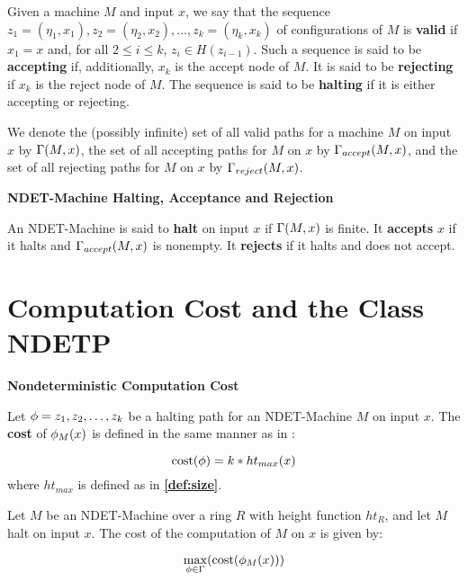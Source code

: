 
Given a machine $M$ and input $x$, we say that the sequence $z_1 =
(\eta_1, x_1), z_2 = (\eta_2, x_2), \ldots, z_k = (\eta_k, x_k)$ of
configurations of $M$ is \textbf{valid} if $x_1 = x$ and, for all $2
\leq i \leq k$, $z_i \in H(z_{i-1})$.  Such a sequence is said to be
\textbf{accepting} if, additionally, $x_k$ is the accept node of $M$.
It is said to be \textbf{rejecting} if $x_k$ is the reject node of
$M$.  The sequence is said to be \textbf{halting} if it is either
accepting or rejecting.

We denote the (possibly infinite) set of all valid paths for a machine
$M$ on input $x$ by $\Gamma(M, x)$, the set of all accepting paths
for $M$ on $x$ by $\Gamma_{accept}(M, x)$, and the set of all rejecting
paths for $M$ on $x$ by $\Gamma_{reject}(M, x)$.

\begin{definition} \textbf{NDET-Machine Halting, Acceptance and Rejection}

  An NDET-Machine is said to \textbf{halt} on input $x$ if
  $\Gamma(M, x)$ is finite.  It \textbf{accepts} $x$ if it halts
  and $\Gamma_{accept}(M, x)$ is nonempty.  It \textbf{rejects} if it halts
  and does not accept.
  
\end{definition}

\section{Computation Cost and the Class NDETP}

\begin{definition} \textbf{Nondeterministic Computation Cost}

  Let $\phi = z_1, z_2, \ldots, z_k$ be a halting path for an
  NDET-Machine $M$ on input $x$.  The \textbf{cost} of $\phi_M(x)$ is
  defined in the same manner as in :

  $$\text{cost}(\phi) = k*ht_{max}(x)$$ where $ht_{max}$ is defined as in 
  \textbf{\ref{def:size}}.

  Let $M$ be an NDET-Machine over a ring $R$ with height function
  $ht_R$, and let $M$ halt on input $x$.  The cost of the computation
  of $M$ on $x$ is given by:
  
  $$\max_{\phi \in \Gamma}(\text{cost}(\phi_M(x)))$$

\end{definition}

